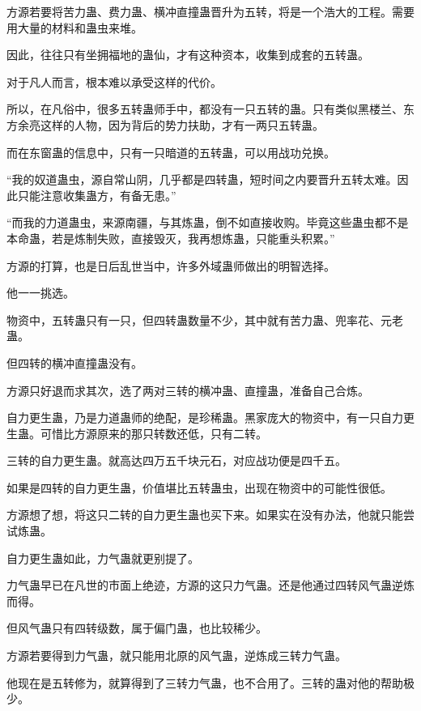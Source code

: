 
\begin{this_body}

方源若要将苦力蛊、费力蛊、横冲直撞蛊晋升为五转，将是一个浩大的工程。需要用大量的材料和蛊虫来堆。

因此，往往只有坐拥福地的蛊仙，才有这种资本，收集到成套的五转蛊。

对于凡人而言，根本难以承受这样的代价。

所以，在凡俗中，很多五转蛊师手中，都没有一只五转的蛊。只有类似黑楼兰、东方余亮这样的人物，因为背后的势力扶助，才有一两只五转蛊。

而在东窗蛊的信息中，只有一只暗道的五转蛊，可以用战功兑换。

“我的奴道蛊虫，源自常山阴，几乎都是四转蛊，短时间之内要晋升五转太难。因此只能注意收集蛊方，有备无患。”

“而我的力道蛊虫，来源南疆，与其炼蛊，倒不如直接收购。毕竟这些蛊虫都不是本命蛊，若是炼制失败，直接毁灭，我再想炼蛊，只能重头积累。”

方源的打算，也是日后乱世当中，许多外域蛊师做出的明智选择。

他一一挑选。

物资中，五转蛊只有一只，但四转蛊数量不少，其中就有苦力蛊、兜率花、元老蛊。

但四转的横冲直撞蛊没有。

方源只好退而求其次，选了两对三转的横冲蛊、直撞蛊，准备自己合炼。

自力更生蛊，乃是力道蛊师的绝配，是珍稀蛊。黑家庞大的物资中，有一只自力更生蛊。可惜比方源原来的那只转数还低，只有二转。

三转的自力更生蛊。就高达四万五千块元石，对应战功便是四千五。

如果是四转的自力更生蛊，价值堪比五转蛊虫，出现在物资中的可能性很低。

方源想了想，将这只二转的自力更生蛊也买下来。如果实在没有办法，他就只能尝试炼蛊。

自力更生蛊如此，力气蛊就更别提了。

力气蛊早已在凡世的市面上绝迹，方源的这只力气蛊。还是他通过四转风气蛊逆炼而得。

但风气蛊只有四转级数，属于偏门蛊，也比较稀少。

方源若要得到力气蛊，就只能用北原的风气蛊，逆炼成三转力气蛊。

他现在是五转修为，就算得到了三转力气蛊，也不合用了。三转的蛊对他的帮助极少。


\end{this_body}
